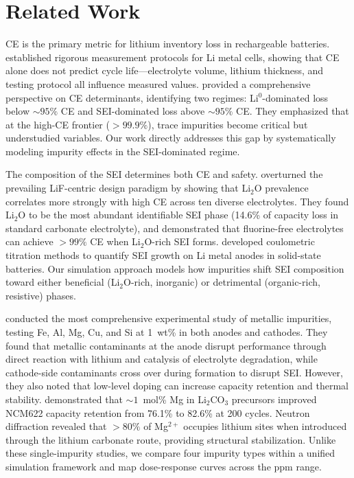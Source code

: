 \section{Related Work}
\label{sec:related}

CE is the primary metric for lithium inventory loss in rechargeable batteries. \citet{xiao2020understanding} established rigorous measurement protocols for Li metal cells, showing that CE alone does not predict cycle life---electrolyte volume, lithium thickness, and testing protocol all influence measured values. \citet{hobold2021beyond} provided a comprehensive perspective on CE determinants, identifying two regimes: Li$^0$-dominated loss below ${\sim}95\%$ CE and SEI-dominated loss above ${\sim}95\%$ CE. They emphasized that at the high-CE frontier ($>99.9\%$), trace impurities become critical but understudied variables. Our work directly addresses this gap by systematically modeling impurity effects in the SEI-dominated regime.

The composition of the SEI determines both CE and safety. \citet{hobold2024lithiumoxide} overturned the prevailing LiF-centric design paradigm by showing that Li$_2$O prevalence correlates more strongly with high CE across ten diverse electrolytes. They found Li$_2$O to be the most abundant identifiable SEI phase (14.6\% of capacity loss in standard carbonate electrolyte), and demonstrated that fluorine-free electrolytes can achieve $>99\%$ CE when Li$_2$O-rich SEI forms. \citet{otto2023sei} developed coulometric titration methods to quantify SEI growth on Li metal anodes in solid-state batteries. Our simulation approach models how impurities shift SEI composition toward either beneficial (Li$_2$O-rich, inorganic) or detrimental (organic-rich, resistive) phases.

\citet{fink2021metallic} conducted the most comprehensive experimental study of metallic impurities, testing Fe, Al, Mg, Cu, and Si at 1~wt\% in both anodes and cathodes. They found that metallic contaminants at the anode disrupt performance through direct reaction with lithium and catalysis of electrolyte degradation, while cathode-side contaminants cross over during formation to disrupt SEI. However, they also noted that low-level doping can increase capacity retention and thermal stability. \citet{choe2024reevaluation} demonstrated that ${\sim}1$~mol\% Mg in Li$_2$CO$_3$ precursors improved NCM622 capacity retention from 76.1\% to 82.6\% at 200 cycles. Neutron diffraction revealed that $>80\%$ of Mg$^{2+}$ occupies lithium sites when introduced through the lithium carbonate route, providing structural stabilization. Unlike these single-impurity studies, we compare four impurity types within a unified simulation framework and map dose-response curves across the ppm range.

